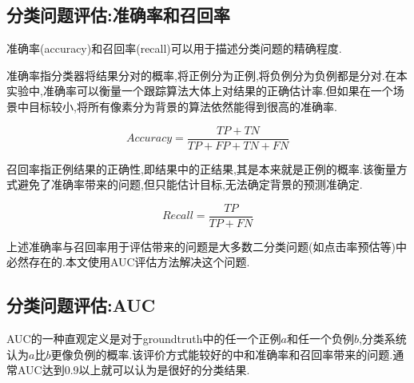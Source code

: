 \subsection{分类问题评估:准确率和召回率}
准确率(accuracy)和召回率(recall)可以用于描述分类问题的精确程度.
\par
准确率指分类器将结果分对的概率,将正例分为正例,将负例分为负例都是分对.在本实验中,准确率可以衡量一个跟踪算法大体上对结果的正确估计率.但如果在一个场景中目标较小,将所有像素分为背景的算法依然能得到很高的准确率.
\par
\begin{equation}\label{equ:accuracy}  Accuracy=\frac{TP+TN}{TP+FP+TN+FN}  \end{equation}
\par
召回率指正例结果的正确性,即结果中的正结果,其是本来就是正例的概率.该衡量方式避免了准确率带来的问题,但只能估计目标,无法确定背景的预测准确定.
\par
\begin{equation}\label{equ:recall}  Recall=\frac{TP}{TP+FN}  \end{equation}
\par
上述准确率与召回率用于评估带来的问题是大多数二分类问题(如点击率预估等)中必然存在的.本文使用AUC评估方法解决这个问题.

\subsection{分类问题评估:AUC}
AUC的一种直观定义是对于groundtruth中的任一个正例$a$和任一个负例$b$,分类系统认为$a$比$b$更像负例的概率.该评价方式能较好的中和准确率和召回率带来的问题.通常AUC达到0.9以上就可以认为是很好的分类结果.